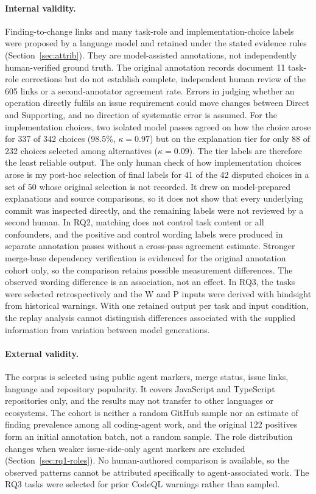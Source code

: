 \documentclass[acmsmall,screen,nonacm,review]{acmart}
\begin{document}
\paragraph{Internal validity.} Finding-to-change links and many task-role and implementation-choice labels were proposed by a language model and retained under the stated evidence rules (Section~\ref{sec:attrib}). They are model-assisted annotations, not independently human-verified ground truth. The original annotation records document 11 task-role corrections but do not establish complete, independent human review of the 605 links or a second-annotator agreement rate. Errors in judging whether an operation directly fulfils an issue requirement could move changes between Direct and Supporting, and no direction of systematic error is assumed. For the implementation choices, two isolated model passes agreed on how the choice arose for 337 of 342 choices (98.5\%, $\kappa=0.97$) but on the explanation tier for only 88 of 232 choices selected among alternatives ($\kappa=0.09$). The tier labels are therefore the least reliable output. The only human check of how implementation choices arose is my post-hoc selection of final labels for 41 of the 42 disputed choices in a set of 50 whose original selection is not recorded. It drew on model-prepared explanations and source comparisons, so it does not show that every underlying commit was inspected directly, and the remaining labels were not reviewed by a second human. In RQ2, matching does not control task content or all confounders, and the positive and control wording labels were produced in separate annotation passes without a cross-pass agreement estimate. Stronger merge-base dependency verification is evidenced for the original annotation cohort only, so the comparison retains possible measurement differences. The observed wording difference is an association, not an effect. In RQ3, the tasks were selected retrospectively and the W and P inputs were derived with hindsight from historical warnings. With one retained output per task and input condition, the replay analysis cannot distinguish differences associated with the supplied information from variation between model generations.

\paragraph{External validity.} The corpus is selected using public agent markers, merge status, issue links, language and repository popularity. It covers JavaScript and TypeScript repositories only, and the results may not transfer to other languages or ecosystems. The cohort is neither a random GitHub sample nor an estimate of finding prevalence among all coding-agent work, and the original 122 positives form an initial annotation batch, not a random sample. The role distribution changes when weaker issue-side-only agent markers are excluded (Section~\ref{sec:rq1-roles}). No human-authored comparison is available, so the observed patterns cannot be attributed specifically to agent-associated work. The RQ3 tasks were selected for prior CodeQL warnings rather than sampled.
\end{document}
